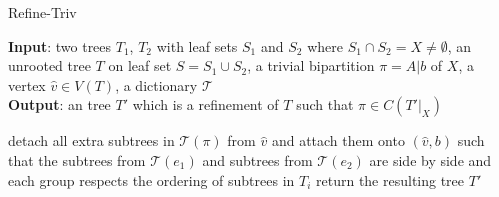 \documentclass{article}
\begin{document}
\begin{algorithm}
    \caption{Refine-Triv}
    \label{alg:trivial_refine}

    \textbf{Input}: two trees $T_1$, $T_2$ with leaf sets $S_1$ and $S_2$ where $S_1 \cap S_2 = X \neq \emptyset$, an unrooted tree $T$ on leaf set $S = S_1 \cup S_2$, a trivial bipartition $\pi = A|b$ of $X$, a vertex $\hat{v} \in V(T)$, a dictionary $\mathcal{T}$\\
    \textbf{Output}: an tree $T'$ which is a refinement of $T$ such that $\pi \in C(T'|_X)$ 
    \begin{algorithmic}[1]
        \State detach all extra subtrees in $\mathcal{T}(\pi)$ from $\hat{v}$ and attach them onto $(\hat{v},b)$ such that the subtrees from $\mathcal{T}(e_1)$ and subtrees from $\mathcal{T}(e_2)$ are side by side and each group respects the ordering of subtrees in $T_i$
        \State return the resulting tree $T'$
    \end{algorithmic}
\end{algorithm}
\end{document}
